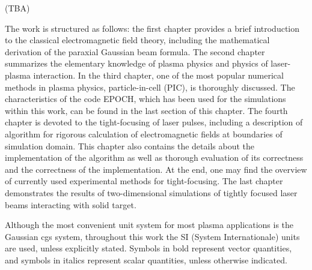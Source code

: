 (TBA)

The work is structured as follows: the first chapter provides a brief introduction to the classical electromagnetic field theory, including the mathematical derivation of the paraxial Gaussian beam formula. The second chapter summarizes the elementary knowledge of plasma physics and physics of laser-plasma interaction. In the third chapter, one of the most popular numerical methods in plasma physics, particle-in-cell (PIC), is thoroughly discussed. The characteristics of the code EPOCH\cite{bennett}, which has been used for the simulations within this work, can be found in the last section of this chapter. The fourth chapter is devoted to the tight-focusing of laser pulses, including a description of algorithm for rigorous calculation of electromagnetic fields at boundaries of simulation domain. This chapter also contains the details about the implementation of the algorithm as well as thorough evaluation of its correctness and the correctness of the implementation. At the end, one may find the overview of currently used experimental methods for tight-focusing. The last chapter demonstrates the results of two-dimensional simulations of tightly focused laser beams interacting with solid target.

Although the most convenient unit system for most plasma applications is the Gaussian cgs system, throughout this work the SI (System Internationale) units are used, unless explicitly stated. Symbols in bold represent vector quantities, and symbols in italics represent scalar quantities, unless otherwise indicated.
